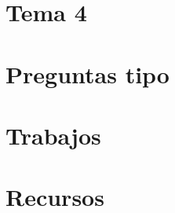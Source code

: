 \documentclass[12pt]{report} %
\begin{document}
\part{Tema 4}


\part{Preguntas tipo}


\part{Trabajos}












\part{Recursos}



\end{document}
